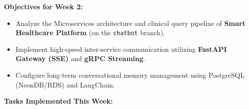 \vspace{0.5em}\noindent\textbf{Objectives for Week 2:}

\begin{itemize}
\tightlist
\item
  Analyze the Microservices architecture and clinical query pipeline of
  \textbf{Smart Healthcare Platform} (on the \texttt{chatbot} branch).
\item
  Implement high-speed inter-service communication utilizing
  \textbf{FastAPI Gateway (SSE)} and \textbf{gRPC Streaming}.
\item
  Configure long-term conversational memory management using PostgreSQL
  (NeonDB/RDS) and LangChain.
\end{itemize}

\vspace{0.5em}\noindent\textbf{Tasks Implemented This Week:}

